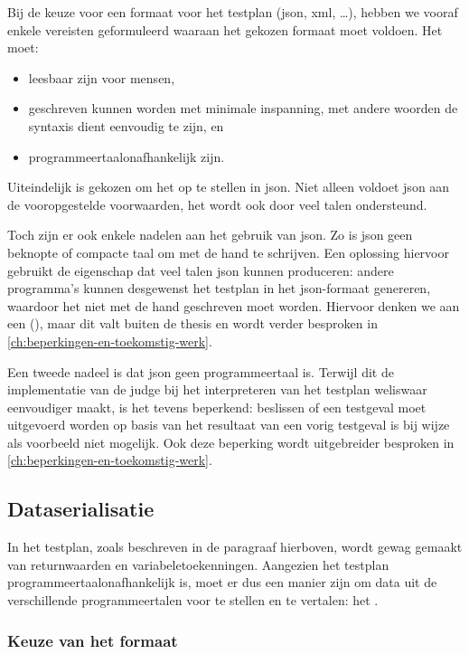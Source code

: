 Bij de keuze voor een formaat voor het testplan (json, xml, \ldots), hebben we vooraf enkele vereisten geformuleerd waaraan het gekozen formaat moet voldoen.
Het moet:

\begin{itemize}
    \item leesbaar zijn voor mensen,
    \item geschreven kunnen worden met minimale inspanning, met andere woorden de syntaxis dient eenvoudig te zijn, en
    \item programmeertaalonafhankelijk zijn.
\end{itemize}

Uiteindelijk is gekozen om het op te stellen in json.
Niet alleen voldoet json aan de vooropgestelde voorwaarden, het wordt ook door veel talen ondersteund.

Toch zijn er ook enkele nadelen aan het gebruik van json.
Zo is json geen beknopte of compacte taal om met de hand te schrijven.
Een oplossing hiervoor gebruikt de eigenschap dat veel talen json kunnen produceren: andere programma's kunnen desgewenst het testplan in het json-formaat genereren, waardoor het niet met de hand geschreven moet worden.
Hiervoor denken we aan een  (), maar dit valt buiten de thesis en wordt verder besproken in \cref{ch:beperkingen-en-toekomstig-werk}.

Een tweede nadeel is dat json geen programmeertaal is.
Terwijl dit de implementatie van de judge bij het interpreteren van het testplan weliswaar eenvoudiger maakt, is het tevens beperkend: beslissen of een testgeval moet uitgevoerd worden op basis van het resultaat van een vorig testgeval is bij wijze als voorbeeld niet mogelijk.
Ook deze beperking wordt uitgebreider besproken in \cref{ch:beperkingen-en-toekomstig-werk}.

\subsection{Dataserialisatie}\label{subsec:dataserialisatie}

In het testplan, zoals beschreven in de paragraaf hierboven, wordt gewag gemaakt van returnwaarden en variabeletoekenningen.
Aangezien het testplan programmeertaalonafhankelijk is, moet er dus een manier zijn om data uit de verschillende programmeertalen voor te stellen en te vertalen: het .

\subsubsection{Keuze van het formaat}

